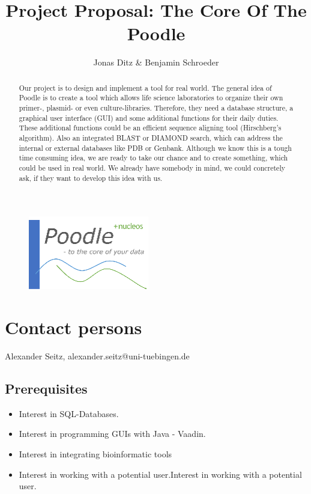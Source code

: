 \documentclass[]{article}
\title{Project Proposal: The Core Of The Poodle}
\author{Jonas Ditz  \& Benjamin Schroeder}
\begin{document}
\maketitle

\begin{figure}[h]
	\centering
	\includegraphics[scale=0.35]{../img/logo_poodle.png}
\end{figure}

\begin{abstract}
Our project is to design and implement a tool for real world. The general idea of Poodle is to create a tool which allows life science laboratories to organize their own primer-, plasmid- or even culture-libraries. Therefore, they need a database structure, a graphical user interface (GUI) and some additional functions for their daily duties. These additional functions could be an efficient sequence aligning tool (Hirschberg's algorithm). Also an integrated BLAST or DIAMOND search, which can address the internal or external databases like PDB or Genbank. Although we know this is a tough time consuming idea, we are ready to take our chance and to create something, which could be used in real world. We already have somebody in mind, we could concretely ask, if they want to develop this idea with us.
\end{abstract}
\newpage


\section*{Contact persons} Alexander Seitz, alexander.seitz@uni-tuebingen.de
\subsection*{Prerequisites}
\begin{itemize}
	\item Interest in SQL-Databases.
	\item Interest in programming GUIs with Java - Vaadin.
	\item Interest in integrating bioinformatic tools
	\item Interest in working with a potential user.Interest in working with a potential user.
\end{itemize}
\end{document}

